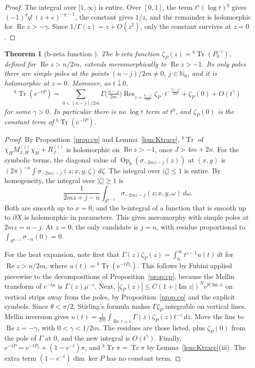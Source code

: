 \documentclass[11pt,oneside,reqno]{article}
\DeclareMathOperator{\Tr}{Tr}
\theoremstyle{plain}
\newtheorem{theorem}{Theorem}[section]
\theoremstyle{definition}
\theoremstyle{remark}
\begin{document}
\begin{proof}
The integral over \([1,\infty)\) is entire. Over \([0,1]\), the term
\(t^{e}(\log t)^q\) gives \((-1)^qq!\,(z+e)^{-q-1}\), the constant gives
\(1/z\), and the remainder is holomorphic for \(\operatorname{Re}z>-\gamma\).
Since \(1/\Gamma(z)=z+O(z^2)\), only the constant survives at \(z=0\).
\end{proof}

\begin{theorem}[b-zeta function {\cite[Def.~8.1, Thm.~8.2]{LoyaThesis}}]
\label{thm:bzeta}
The b-zeta function \(\zeta_P(z)={}^b\Tr(P_0^{-z})\), defined for
\(\operatorname{Re}z>n/2m\), extends meromorphically to
\(\operatorname{Re}z>-1\). Its only poles there are simple poles at the
points \((n-j)/2m\neq0\), \(j\in\mathbb N_0\), and it is holomorphic at
\(z=0\). Moreover, as \(t\downarrow0\),
\[
 {}^b\Tr(e^{-tP})=\sum_{0<(n-j)/2m}\Gamma\bigl(\tfrac{n-j}{2m}\bigr)
 \operatorname{Res}_{z=\frac{n-j}{2m}}\zeta_P\cdot t^{-\frac{n-j}{2m}}
 +\zeta_P(0)+O(t^{\gamma})
\]
for some \(\gamma>0\). In particular there is no \(\log t\) term at
\(t^0\), and \(\zeta_P(0)\) is the constant term of \({}^b\Tr(e^{-tP})\).
\end{theorem}

\begin{proof}
By Proposition~\ref{prop:cp} and Lemma~\ref{lem:Ktrace}, \({}^b\Tr\) of
\(\chi_HM^{(z)}_{J,H}\chi_H+R^{(z)}_J\) is holomorphic on
\(\operatorname{Re}z>-1\), once \(J>4m+2n\). For the symbolic terms, the
diagonal value of \(\operatorname{Op}_b(\sigma_{-2mz-j}(z))\) at \((x,y)\) is
\((2\pi)^{-n}\int\sigma_{-2mz-j}(z;x,y,\zeta)\,d\zeta\). The integral over
\(|\zeta|\leq1\) is entire. By homogeneity, the integral over
\(|\zeta|\geq1\) is
\[
 \frac1{2mz+j-n}\int_{S^{n-1}}\sigma_{-2mz-j}(z;x,y,\omega)\,d\omega .
\]
Both are smooth up to \(x=0\), and the b-integral of a function that is
smooth up to \(\partial X\) is holomorphic in parameters. This gives
meromorphy with simple poles at \(2mz=n-j\). At \(z=0\), the only candidate
is \(j=n\), with residue proportional to \(\int_{S^{n-1}}\sigma_{-n}(0)=0\).

For the heat expansion, note first that
\(\Gamma(z)\zeta_P(z)=\int_0^\infty t^{z-1}u(t)\,dt\) for
\(\operatorname{Re}z>n/2m\), where \(u(t)={}^b\Tr(e^{-tP_0})\). This follows
by Fubini applied piecewise to the decompositions of
Proposition~\ref{prop:cp}, because the Mellin transform of
\(e^{-t\mu}\) is \(\Gamma(z)\mu^{-z}\). Next,
\(|\zeta_P(z)|\leq C(1+|\operatorname{Im}z|)^Ne^{\theta|\operatorname{Im}z|}\)
on vertical strips away from the poles, by Proposition~\ref{prop:cp} and the
explicit symbols. Since \(\theta<\pi/2\), Stirling's formula makes
\(\Gamma\zeta_P\) integrable on vertical lines. Mellin inversion gives
\(u(t)=\frac1{2\pi i}\int_{\operatorname{Re}z=c}\Gamma(z)\zeta_P(z)t^{-z}\,dz\).
Move the line to \(\operatorname{Re}z=-\gamma\), with
\(0<\gamma<1/2m\). The residues are those listed, plus \(\zeta_P(0)\) from
the pole of \(\Gamma\) at \(0\), and the new integral is \(O(t^\gamma)\).
Finally, \(e^{-tP}=e^{-tP_0}+(1-e^{-t})\pi\), and \({}^b\Tr\pi=\Tr\pi\) by
Lemma~\ref{lem:Ktrace}(iii). The extra term \((1-e^{-t})\dim\ker P\) has no
constant term.
\end{proof}
\end{document}

